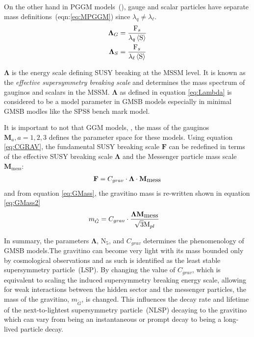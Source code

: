 {On the other hand in PGGM models~(\cite{PGGM}), gauge and scalar particles have separate mass definitions~(eqn:\ref{eq:MPGGM}) since $\lambda_{q} \neq \lambda_{\ell}$.
\begin{align}{\label{eq:MPGGM}}
\mathbf{\Lambda}_{G} &= \frac{\mathrm{F}_{s}}{\lambda_{q} \left\langle \mathrm{S} \right\rangle } \\
\mathbf{\Lambda}_{S} &= \frac{\mathrm{F}_{s}}{\lambda_{\ell} \left\langle \mathrm{S} \right\rangle } 
\end{align}

$\mathbf{\Lambda}$ is the energy scale defining SUSY breaking at the MSSM level. It is known as the \textit{effective supersymmetry breaking scale} and determines the mass spectrum of gauginos and scalars in the MSSM.
$\mathbf{\Lambda}$ as defined in equation \ref{eq:Lambda} is considered to be a model parameter in GMSB models especially in minimal GMSB modles like the SPS8 bench mark model.

It is important to not that GGM models, \cite{GGM, GGM1, GGM2,MDINE1,MDINE2}, the mass of the gauginos $\mathbf{M}_{a}, a = 1,2,3$ defines the parameter space for these models.
Using equation \ref{eq:CGRAV}, the fundamental SUSY breaking scale $\mathbf{F}$ can be redefined in terms of the effective SUSY breaking scale $\mathbf{\Lambda}$  and the Messenger particle mass scale $\mathbf{M}_{\mbox{mess}}$:
\begin{align}{\label{eq:scale}}
\mathbf{F} = C_{grav}\cdot \mathbf{\Lambda}\cdot\mathbf{M}_{\mbox{mess}} 
\end{align}
and from equation \ref{eq:GMass}, the gravitino mass is re-written shown in equation \ref{eq:GMass2}
\begin{align}{\label{eq:GMass2}}
m_{\tilde{G}} & = C_{grav}\cdot \frac{\mathbf{\Lambda}\mathbf{M}_{\mbox{mess}}}{\sqrt{3}\mathrm{M}_{pl}}
\end{align}

In summary, the parameters $\mathbf{\Lambda}$, $\mathrm{N_{5}}$, and  $C_{grav}$  determines the phenomenology of GMSB models.The gravitino can become very light with its mass bounded only by cosmological observations and as such is identified as  the least stable supersymmetry particle~(LSP). By changing the value of $C_{grav}$, which is equivalent to scaling the induced supersymmetry breaking energy scale, allowing for weak interactions between the hidden sector and the messenger particles, the mass of the gravitino, $m_{\tilde{G}}$, is changed. This influences the decay rate and lifetime of the next-to-lightest supersymmetry particle~(NLSP) decaying to the gravitino which can vary from being an instantaneous or prompt decay to being a long-lived particle decay.


}
